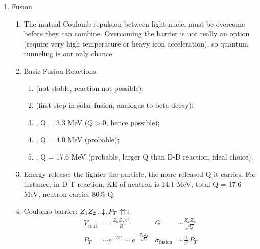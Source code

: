\documentclass{school-22.101-notes}
\begin{document}
\begin{enumerate}
\begin{enumerate}
\end{enumerate}

\item Fusion
\begin{enumerate}
\item The mutual Coulomb repulsion between light nuclei must be overcome before they can combine. Overcoming the barrier is not really an option (require very high temperature or heavy icon acceleration), so quantum tunneling is our only chance. 
\item Basic Fusion Reactions: 
\begin{enumerate}
\item {} (not stable, reaction not possible); 
\item {} (first step in solar fusion, analogus to beta decay);
\item {}, Q = 3.3 MeV ($Q>0$, hence possible); 
\item {}, Q = 4.0 MeV (probable);
\item {}, Q = 17.6 MeV (probable, larger Q than D-D reaction, ideal choice).
\end{enumerate}
\item Energy release: the lighter the particle, the more released Q it carries. For instance, in D-T reaction, KE of neutron is 14.1 MeV, total Q = 17.6 MeV, neutron carries 80\% Q.
\item Coulomb barrier: $Z_1 Z_2 \downarrow \downarrow, P_T \uparrow \uparrow$:
\begin{align}
V_{\mathrm{coul}} &= \frac{Z_{a} Z_{X} e^2 }{R} & G &\sim \frac{Z_a Z_x}{\sqrt{Q}} \\
P_T &\sim e^{-2G} \sim e^{- \frac{Z_a Z_X}{\sqrt{Q}}} & \sigma_{\mathrm{fusion}} &\sim \frac{1}{v^2} P_T
\end{align}
\end{enumerate}
\end{enumerate}
\end{document}
